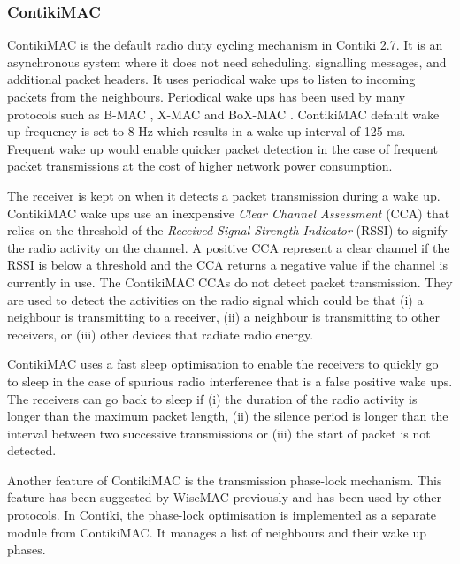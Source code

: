 \subsubsection{ContikiMAC}
ContikiMAC \cite{contikimac} is the default radio duty cycling mechanism in Contiki 2.7. It is an asynchronous system where it does not need scheduling, signalling messages, and additional packet headers. It uses periodical wake ups to listen to incoming packets from the neighbours. Periodical wake ups has been used by many protocols such as B-MAC \cite{bmac}, X-MAC \cite{xmac} and BoX-MAC \cite{boxmac}. 
ContikiMAC default wake up frequency is set to 8 Hz which results in a wake up interval of 125 ms. Frequent wake up would enable quicker packet detection in the case of frequent packet transmissions at the cost of higher network power consumption.

The receiver is kept on when it detects a packet transmission during a wake up. ContikiMAC wake ups use an inexpensive \textit{Clear Channel Assessment} (CCA) that relies on the threshold of the \textit{Received Signal Strength Indicator} (RSSI) to signify the radio activity on the channel. A positive CCA represent a clear channel if the RSSI is below a threshold and the CCA returns a negative value if the channel is currently in use. The ContikiMAC CCAs do not detect packet transmission. They are used to detect the activities on the radio signal which could be that (i) a neighbour is transmitting to a receiver, (ii) a neighbour is transmitting to other receivers, or (iii) other devices that radiate radio energy. 

ContikiMAC uses a fast sleep optimisation to enable the receivers to quickly go to sleep in the case of spurious radio interference that is a false positive wake ups. The receivers can go back to sleep if (i) the duration of the radio activity is longer than the maximum packet length, (ii) the silence period is longer than the interval between two successive transmissions or (iii) the start of packet is not detected.

Another feature of ContikiMAC is the transmission phase-lock mechanism. This feature has been suggested by WiseMAC \cite{wisemac} previously and has been used by other protocols. In Contiki, the phase-lock optimisation is implemented as a separate module from ContikiMAC. It manages a list of neighbours and their wake up phases. 

